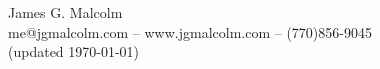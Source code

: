 \documentclass{article}
\begin{document}
\titleformat{\section}[block]{\normalfont}{\thesection}{.5em}{\titlerule\\[.8ex]\bfseries}
\titleformat{\subsection}{\normalfont}{\thesection}{-.5em}{\vspace{-1.5ex}\slshape}


\begin{center}
  {\Large James G. Malcolm} \\
  {\small
    me@jgmalcolm.com --
    www.jgmalcolm.com --
    (770)856-9045} \\
  {\small (updated \today)}
\end{center}
\vspace{-1.7em}
\end{document}
